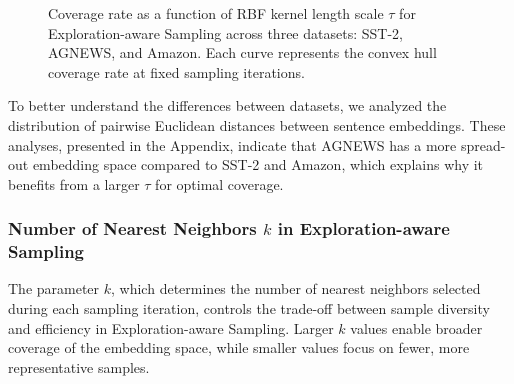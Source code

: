 
\begin{figure*}[htbp]
    \centering
    \caption{Coverage rate as a function of RBF kernel length scale $\tau$ for Exploration-aware Sampling across three datasets: SST-2, AGNEWS, and Amazon. Each curve represents the convex hull coverage rate at fixed sampling iterations.}
    \label{fig:para_anal}
\end{figure*}


To better understand the differences between datasets, we analyzed the distribution of pairwise Euclidean distances between sentence embeddings. These analyses, presented in the Appendix, indicate that AGNEWS has a more spread-out embedding space compared to SST-2 and Amazon, which explains why it benefits from a larger $\tau$ for optimal coverage.


\subsubsection{Number of Nearest Neighbors $k$ in Exploration-aware Sampling}

The parameter $k$, which determines the number of nearest neighbors selected during each sampling iteration, controls the trade-off between sample diversity and efficiency in Exploration-aware Sampling. Larger $k$ values enable broader coverage of the embedding space, while smaller values focus on fewer, more representative samples.


